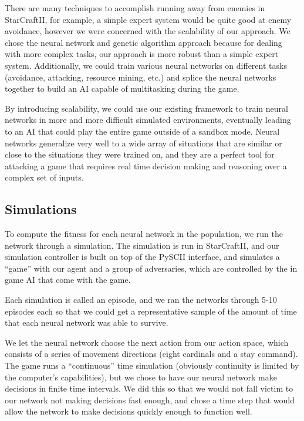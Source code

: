 \documentclass{article}
\begin{document}
There are many techniques to accomplish running away from enemies in
StarCraftII, for example, a simple expert system would be quite good at enemy
avoidance, however we were concerned with the scalability of our approach. We
chose the neural network and genetic algorithm approach because for dealing
with more complex tasks, our approach is more robust than a simple expert
system. Additionally, we could train various neural networks on different
tasks (avoidance, attacking, resource mining, etc.) and splice the neural
networks together to build an AI capable of multitasking during the game.

By introducing scalability, we could use our existing framework to train neural
networks in more and more difficult simulated environments, eventually leading
to an AI that could play the entire game outside of a sandbox mode. Neural
networks generalize very well to a wide array of situations that are similar or
close to the situations they were trained on, and they are a perfect tool for
attacking a game that requires real time decision making and reasoning over a
complex set of inputs.

\subsection{Simulations}
To compute the fitness for each neural network in the population, we run the
network through a simulation. The simulation is run in StarCraftII, and our
simulation controller is built on top of the PySCII interface, and simulates
a ``game'' with our agent and a group of adversaries, which are controlled by
the in game AI that come with the game.

Each simulation is called an episode, and we ran the networks through 5-10
episodes each so that we could get a representative sample of the amount of time
that each neural network was able to survive.

We let the neural network choose the next action from our action space, which
consists of a series of movement directions (eight cardinals and a stay
command). The game runs a ``continuous'' time simulation (obviously continuity
is limited by the computer's capabilities), but we chose to have our neural
network make decisions in finite time intervals. We did this so that we would
not fall victim to our network not making decisions fast enough, and chose a
time step that would allow the network to make decisions quickly enough to
function well.
\end{document}
